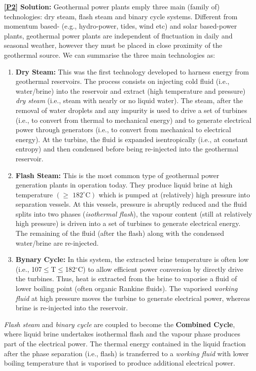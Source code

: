 \documentclass[12pts,a4paper,amsmath,amssymb,floatfix]{article}%
\renewcommand\le{\leqslant}
\renewcommand\ge{\geqslant}
\begin{document}
{\bf \ref{P2} Solution:} Geothermal power plants emply three main (family of) technologies: dry steam, flash steam and binary cycle systems. Different from momentum based- (e.g., hydro-power, tides, wind etc) and solar based-power plants, geothermal power plants are independent of fluctuation in daily and seasonal weather, however they must be placed in close proximity of the geothermal source. We can summarise the three main technologies as:
\begin{enumerate}
%
    \item {\bf Dry Steam:} This was the first technology developed to harness energy from geothermal reservoirs. The process consists on injecting cold fluid (i.e., water/brine) into the reservoir and extract (high temperature and pressure) {\it dry steam} (i.e., steam with nearly or no liquid water). The steam, after the removal of water droplets and any impurity is used to drive a set of turbines (i.e., to convert from thermal to mechanical energy) and to generate electrical power through generators (i.e., to convert from mechanical to electrical energy). At the turbine, the fluid is expanded isentropically (i.e., at constant entropy) and then condensed before being re-injected into the geothermal reservoir.
%
    \item {\bf Flash Steam:} This is the most common type of geothermal power generation plants in operation today. They produce liquid brine at high temperature $\left(\ge\text{ 182}^{\circ}\text{C}\right)$ which is pumped at (relatively) high pressure into separation vessels. At this vessels, pressure is abruptly reduced and the fluid splits into two phases ({\it isothermal flash}), the vapour content (still at relatively high pressure) is driven into a set of turbines to generate electrical energy. The remaining of the fluid (after the flash) along with the condensed water/brine are re-injected.
%
    \item {\bf Bynary Cycle:} In this system, the extracted brine temperature is often low (i.e., 107$\le$T$\le$182$^{\circ}$C) to allow efficient power conversion by directly drive the turbines. Thus, heat is extracted from the brine to vaporise a fluid of lower boiling point (often organic Rankine fluids). The vaporised {\it working fluid} at high pressure moves the turbine to generate electrical power, whereas brine is re-injected into the reservoir.
%
\end{enumerate}
%
{\it Flash steam} and {\it binary cycle} are coupled to become the {\bf Combined Cycle}, where liquid brine undertakes isothermal flash and the vapour phase produces part of the electrical power. The thermal energy contained in the liquid fraction after the phase separation (i.e., flash) is transferred to a {\it working fluid} with lower boiling temperature that is vaporised to produce additional electrical power.
%
\end{document}

